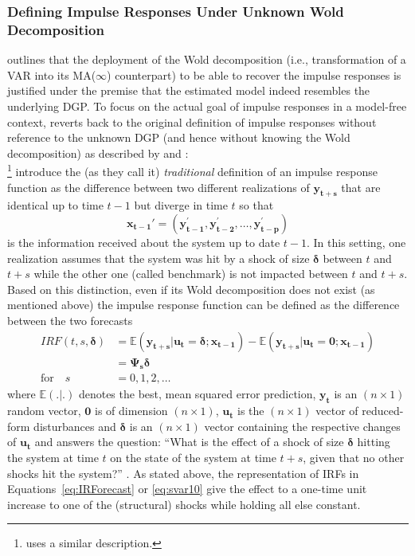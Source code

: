 \documentclass[a4paper,11pt,listof=nochaptergap,oneside,pointednumbers,bibtotoc,bigheadings,liststotoc]{scrbook}
\theoremstyle{mysatz}
\theoremstyle{mydefinition}
\theoremstyle{mybemerkung}
\renewcommand*{\paragraph}[1]{\subsubsection*{#1} \vspace{-3mm}} %
\newcommand{\vect}[1]{\boldsymbol{\mathbf{#1}}}
\begin{document}
\begin{itemize}
\paragraph{Defining Impulse Responses Under Unknown Wold Decomposition}
\citet{jorda:05} outlines that the deployment of the Wold decomposition (i.e., transformation of a VAR into its MA($\infty$) counterpart) to be able to recover the impulse responses is justified under the premise that the estimated model indeed resembles the underlying DGP. To focus on the actual goal of impulse responses in a model-free context, \citet{jorda:05} reverts back to the original definition of impulse responses without reference to the unknown DGP (and hence without knowing the Wold decomposition) as described by \citet{koopetal:96} and \citet{hamilton:94}:\\
\citet{koopetal:96}\footnote{\citet{hamilton:94} uses a similar description.} introduce the (as they call it) \textit{traditional} definition of an impulse response function as the difference between two different realizations of $\vect{y_{t+s}}$ that are identical up to time $t-1$ but diverge in time $t$ so that 
\begin{equation}
	\vect{x_{t-1}'} = (\vect{y_{t-1}^'}, \vect{y_{t-2}^'}, \dots, \vect{y_{t-p}^'})
\end{equation}
is the information received about the system up to date $t-1$. In this setting, one realization assumes that the system was hit by a shock of size $\vect{\delta}$ between $t$ and $t+s$ while the other one (called benchmark) is not impacted between $t$ and $t+s$. Based on this distinction, even if its Wold decomposition does not exist (as mentioned above) the impulse response function can be defined as the difference between the two forecasts
\begin{equation}\label{eq:IRForecast}
\begin{split}
	IRF(t, s, \vect{\delta}) & = \mathbb{E}(\vect{y_{t+s}}|\vect{u_t}=\vect{\delta}; \vect{x_{t-1}}) - \mathbb{E}(\vect{y_{t+s}}|\vect{u_t}=\vect{0};\vect{x_{t-1}}) \\
	& = \vect{\Psi_s \delta} \\
	\text{for} \quad s & = 0, 1, 2, \dots
\end{split}
\end{equation}
where $\mathbb{E}(.|.)$ denotes the best, mean squared error prediction, $\vect{y_t}$ is an $(n \times 1)$ random vector, $\vect{0}$ is of dimension $(n \times 1)$, $\vect{u_t}$ is the $(n \times 1)$ vector of reduced-form disturbances and $\vect{\delta}$ is an $(n \times 1)$ vector containing the respective changes of $\vect{u_t}$ and answers the question: ``What is the effect of a shock of size $\vect{\delta}$ hitting the system at time $t$ on the state of the system at time $t+s$, given that no other shocks hit the system?'' \citep{koopetal:96}. As stated above, the representation of IRFs in Equations~\ref{eq:IRForecast} or \ref{eq:svar10} give the effect to a one-time unit increase to one of the (structural) shocks while holding all else constant. 

\end{itemize}
\end{document}
